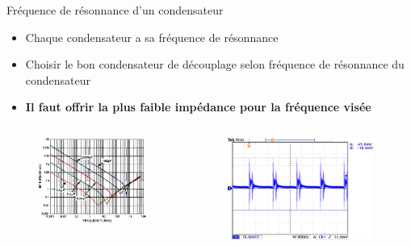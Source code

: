 \begin{frame}{Fréquence de résonnance d'un condensateur}
    \begin{itemize}
        \item Chaque condensateur a sa fréquence de résonnance
        \item Choisir le bon condensateur de découplage selon fréquence de résonnance du condensateur
        \item \textbf{Il faut offrir la plus faible impédance pour la fréquence visée}
    \end{itemize}
    \vspace{-12pt}
    \begin{columns}
        \begin{column}{0.5\textwidth}
            \begin{figure}
                \includegraphics[width=\textwidth, height=0.55\textheight, keepaspectratio]{pictures/capacitor-resonant-frequency.png}
            \end{figure}
        \end{column}
        \begin{column}{0.5\textwidth}
            \begin{figure}
                \includegraphics[width=0.95\textwidth, height=0.75\textheight, keepaspectratio]{pictures/switching-psu-ripple.png}

\end{figure}
\end{column}
\end{columns}
\end{frame}
